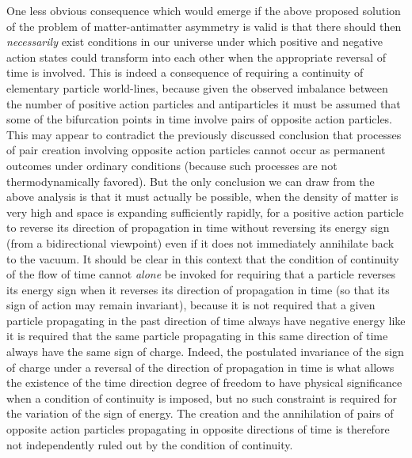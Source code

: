 \documentclass[notitlepage,12pt]{report}
\begin{document}
One less obvious consequence which would emerge if the above proposed solution of the problem of matter-antimatter asymmetry is valid is that there should then \textit{necessarily} exist conditions in our universe under which positive and negative action states could transform into each other when the appropriate reversal of time is involved. This is indeed a consequence of requiring a continuity of elementary particle world-lines, because given the observed imbalance between the number of positive action particles and antiparticles it must be assumed that some of the bifurcation points in time involve pairs of opposite action particles. This may appear to contradict the previously discussed conclusion that processes of pair creation involving opposite action particles cannot occur as permanent outcomes under ordinary conditions (because such processes are not thermodynamically favored). But the only conclusion we can draw from the above analysis is that it must actually be possible, when the density of matter is very high and space is expanding sufficiently rapidly, for a positive action particle to reverse its direction of propagation in time without reversing its energy sign (from a bidirectional viewpoint) even if it does not immediately annihilate back to the vacuum. It should be clear in this context that the condition of continuity of the flow of time cannot \textit{alone} be invoked for requiring that a particle reverses its energy sign when it reverses its direction of propagation in time (so that its sign of action may remain invariant), because it is not required that a given particle propagating in the past direction of time always have negative energy like it is required that the same particle propagating in this same direction of time always have the same sign of charge. Indeed, the postulated invariance of the sign of charge under a reversal of the direction of propagation in time is what allows the existence of the time direction degree of freedom to have physical significance when a condition of continuity is imposed, but no such constraint is required for the variation of the sign of energy. The creation and the annihilation of pairs of opposite action particles propagating in opposite directions of time is therefore not independently ruled out by the condition of continuity.
\end{document}
